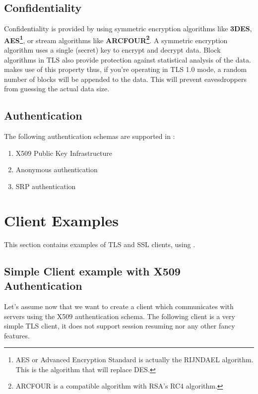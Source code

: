 \documentclass{book}
\begin{document}
\subsection{Confidentiality}
\par
Confidentiality is provided by using symmetric encryption algorithms like {\bf 3DES}, 
{\bf AES\footnote{AES or Advanced Encryption Standard is actually the RIJNDAEL algorithm. This is the
algorithm that will replace DES.}}, or
stream algorithms like {\bf ARCFOUR\footnote{ARCFOUR is a compatible
algorithm with RSA's RC4 algorithm.}}. A symmetric encryption algorithm uses a single (secret) key
to encrypt and decrypt data. Block algorithms in TLS also provide protection
against statistical analysis of the data. \gnutls makes use of this property
thus, if you're operating in TLS 1.0 mode, a random number of blocks will be
appended to the data. This will prevent eavesdroppers from guessing the 
actual data size.

\subsection{Authentication}
\par
The following authentication schemas are supported in \gnutls:
\begin{enumerate}
 \item X509 Public Key Infrastructure
 \item Anonymous authentication
 \item SRP authentication
\end{enumerate}







\section{Client Examples}
This section contains examples of TLS and SSL clients, using \gnutls. 

\subsection{Simple Client example with X509 Authentication}
Let's assume now that we want to create a client which communicates
with servers using the X509 authentication schema. The following client
is a very simple TLS client, it does not support session resuming nor
any other fancy features.

\end{document}
